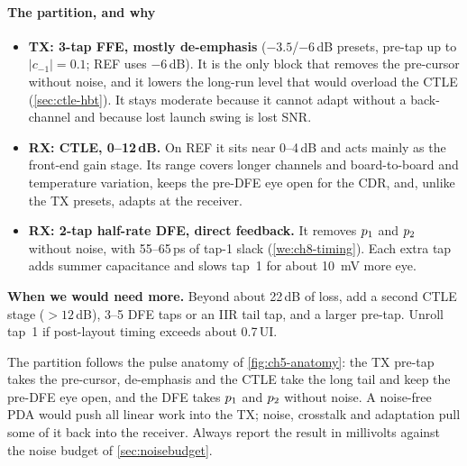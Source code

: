 \paragraph{The \OS{} partition, and why}
\begin{itemize}
  \item \textbf{TX: 3-tap FFE, mostly de-emphasis} ($-3.5$/$-6$\,dB presets, pre-tap up to $\lvert c_{-1}\rvert=0.1$; REF uses $-6$\,dB). It is the only block that removes the pre-cursor without noise, and it lowers the long-run level that would overload the CTLE (\cref{sec:ctle-hbt}). It stays moderate because it cannot adapt without a back-channel and because lost launch swing is lost SNR.
  \item \textbf{RX: CTLE, 0--12\,dB.} On REF it sits near 0--4\,dB and acts mainly as the front-end gain stage. Its range covers longer channels and board-to-board and temperature variation, keeps the pre-DFE eye open for the CDR, and, unlike the TX presets, adapts at the receiver.
  \item \textbf{RX: 2-tap half-rate DFE, direct feedback.} It removes $p_{1}$ and $p_{2}$ without noise, with 55--65\,ps of tap-1 slack (\cref{we:ch8-timing}). Each extra tap adds summer capacitance and slows tap~1 for about \qty{10}{\milli\volt} more eye.
\end{itemize}
\textbf{When we would need more.} Beyond about 22\,dB of loss, add a second CTLE stage ($>12$\,dB), 3--5 DFE taps or an IIR tail tap, and a larger pre-tap. Unroll tap~1 if post-layout timing exceeds about 0.7\,UI.

\begin{insight}
The partition follows the pulse anatomy of \cref{fig:ch5-anatomy}: the TX pre-tap takes the pre-cursor, de-emphasis and the CTLE take the long tail and keep the pre-DFE eye open, and the DFE takes $p_{1}$ and $p_{2}$ without noise. A noise-free PDA would push all linear work into the TX; noise, crosstalk and adaptation pull some of it back into the receiver. Always report the result in millivolts against the noise budget of \cref{sec:noisebudget}.
\end{insight}

